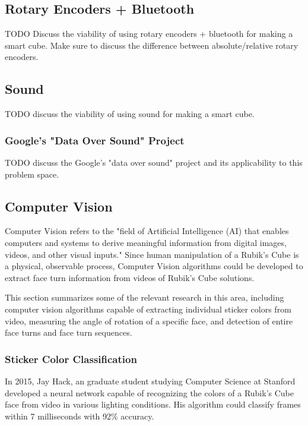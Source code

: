 \subsection{Rotary Encoders + Bluetooth}
TODO Discuss the viability of using rotary encoders + bluetooth for making a smart cube. Make sure to discuss the difference between absolute/relative rotary encoders.


\subsection{Sound}
TODO discuss the viability of using sound for making a smart cube.

\subsubsection{Google's "Data Over Sound" Project}
TODO discuss the Google's "data over sound" project and its applicability to this problem space.


\subsection{Computer Vision}
Computer Vision refers to the "field of Artificial Intelligence (AI) that enables computers and systems to derive meaningful information from digital images, videos, and other visual inputs." \cite{ibm-cv-definition}
Since human manipulation of a Rubik's Cube is a physical, observable process, Computer Vision algorithms could be developed to extract face turn information from videos of Rubik's Cube solutions.

This section summarizes some of the relevant research in this area, including computer vision algorithms capable of extracting individual sticker colors from video, measuring the angle of rotation of a specific face, and detection of entire face turns and face turn sequences.

\subsubsection{Sticker Color Classification}
In 2015, Jay Hack, an graduate student studying Computer Science at Stanford developed a neural network capable of recognizing the colors of a Rubik's Cube face from video in various lighting conditions.
His algorithm could classify frames within 7 milliseconds with 92\% accuracy. \cite{jay-hack-opencv}

